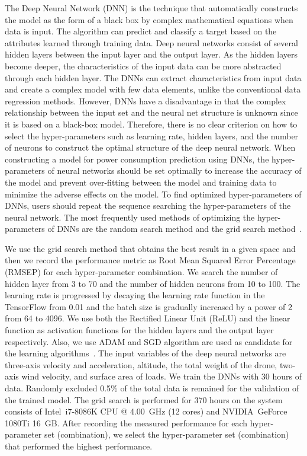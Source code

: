 \documentclass[journal]{./template/IEEEtran}
\begin{document}
The Deep Neural Network (DNN) is the technique that automatically constructs the model as the form of a black box by complex mathematical equations when data is input.
The algorithm can predict and classify a target based on the attributes learned through training data. 
Deep neural networks consist of several hidden layers between the input layer and the output layer.
As the hidden layers become deeper, the characteristics of the input data can be more abstracted through each hidden layer.
The DNNs can extract characteristics from input data and create a complex model with few data elements, unlike the conventional data regression methods.
However, DNNs have a disadvantage in that the complex relationship between the input set and the neural net structure is unknown since it is based on a black-box model. 
Therefore, there is no clear criterion on how to select the hyper-parameters such as learning rate, hidden layers, and the number of neurons to construct the optimal structure of the deep neural network. 
When constructing a model for power consumption prediction using DNNs, the hyper-parameters of neural networks should be set optimally to increase the accuracy of the model and prevent over-fitting between the model and training data to minimize the adverse effects on the model.
To find optimized hyper-parameters of DNNs, users should repeat the sequence searching the hyper-parameters of the neural network. 
The most frequently used methods of optimizing the hyper-parameters of DNNs are the random search method and the grid search method~\cite{ref_16}. 

We use the grid search method that obtains the best result in a given space and then we record the performance metric as Root Mean Squared Error Percentage (RMSEP) for each hyper-parameter combination.
We search the number of hidden layer from 3 to 70 and the number of hidden neurons from 10 to 100. 
The learning rate is progressed by decaying the learning rate function in the TensorFlow from 0.01 and the batch size is gradually increased by a power of 2 from 64 to 4096.
We use both the Rectified Linear Unit (ReLU) and the linear function as activation functions for the hidden layers and the output layer respectively. 
Also, we use ADAM and SGD algorithm are used as candidate for the learning algorithms~\cite{ref_17}. 
The input variables of the deep neural networks are three-axis velocity and acceleration, altitude, the total weight of the drone, two-axis wind velocity, and surface area of loads. 
We train the DNNs with 30 hours of data. Randomly excluded 0.5\% of the total data is remained for the validation of the trained model.
The grid search is performed for 370 hours on the system consists of Intel\textregistered ~i7-8086K CPU @ 4.00~GHz (12 cores) and NVIDIA\textregistered ~GeForce 1080Ti 16~GB.
After recording the measured performance for each hyper-parameter set (combination), we select the hyper-parameter set (combination) that performed the highest performance.
\end{document}
